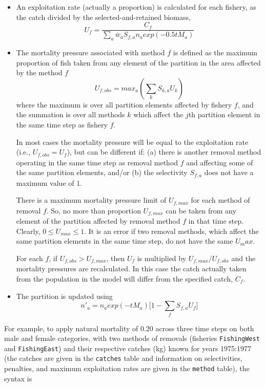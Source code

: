 \begin{itemize}
	\item An exploitation rate (actually a proportion) is calculated for each fishery, as the catch divided by the selected-and-retained biomass,
	$$ U_f = \frac{C_f}{\sum_a \bar{w}_a S_{f,a} n_a exp(-0.5 t M_a)}$$
	\item The mortality pressure associated with method $f$ is defined as the maximum proportion of fish taken from any element of the partition in the area affected by the method $f$
	$$ U_{f,obs} = max_a(\sum_k S_{k,a} U_k) $$
	where the maximum is over all partition elements affected by fishery $f$, and the summation is over all methods $k$ which affect the $j$th partition element in the same time step as fishery $f$.

	In most cases the mortality pressure will be equal to the exploitation rate (i.e., $U_{f,obs} = U_f$), but can be different if: (a) there is another removal method operating in the same time step as removal method $f$ and affecting some of the same partition elements, and/or (b) the selectivity $S_{f,a}$ does not have a maximum value of 1.

	There is a maximum mortality pressure limit of $U_{f,max}$ for each method of removal $f$. So, no more than proportion $U_{f,max}$ can be taken from any element of the partition affected by removal method $f$ in that time step. Clearly, $0 \leq U_{max} \leq 1$. It is an error if two removal methods, which affect the same partition elements in the same time step, do not have the same $U_max$.

	For each $f$, if $U_{f,obs} > U_{f,max}$, then $U_f$ is multiplied by $U_{f,max}/U_{f,obs}$ and the mortality pressures are recalculated. In this case the catch actually taken from the population in the model will differ from the specified catch, $C_f$.

	\item The partition is updated using
		$$ n'_a = n_a exp(-tM_a)\big[1 - \sum_f S_{f,a} U_f \big] $$
\end{itemize}

For example, to apply natural mortality of $0.20$ across three time steps on both male and female categories, with two methods of removals (fisheries \texttt{FishingWest} and \texttt{FishingEast}) and their respective catches (kg) known for years 1975:1977 (the catches are given in the \texttt{catches} table and information on selectivities, penalties, and maximum exploitation rates are given in the \texttt{method} table), the syntax is

